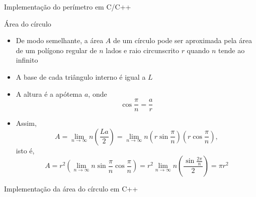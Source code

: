 \begin{frame}[fragile]{Implementação do perímetro em C/C++}


\end{frame}

\begin{frame}[fragile]{Área do círculo}

    \begin{itemize}
        \item De modo semelhante, a área $A$ de um círculo pode ser aproximada pela área de um
            polígono regular de $n$ lados e raio circunscrito $r$ quando $n$ tende ao infinito
        \pause

        \item A base de cada triângulo interno é igual a $L$
        \pause

        \item A altura é a apótema $a$, onde
        \[
            \cos \frac{\pi}{n} = \frac{a}{r}
        \]
        \pause

        \item Assim,
        \[
            A = \lim_{n\to \infty} n \left(\frac{La}{2}\right)
            = \lim_{n\to \infty} n \left(r\sin \frac{\pi}{n}\right)\left(r\cos\frac{\pi}{n}\right),
        \] isto é,
        \[
            A = r^2\left(\lim_{n\to\infty} n\sin \frac{\pi}{n}\cos\frac{\pi}{n}\right)
            = r^2\lim_{n\to\infty} n\left(\frac{\sin \frac{2\pi}{n}}{2}\right)
            = \pi r^2
        \]

    \end{itemize}

\end{frame}

\begin{frame}[fragile]{Implementação da área do círculo em C++}
\end{frame}

